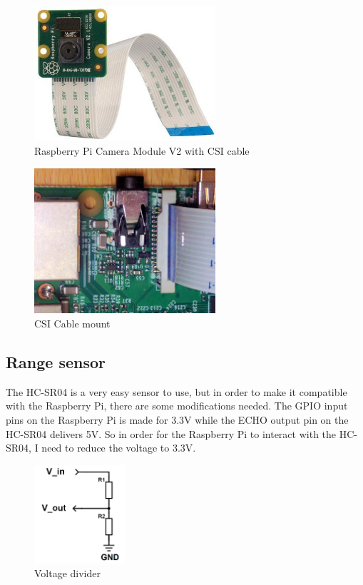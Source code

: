 \begin{figure}[h]
  \centering
  \includegraphics[width=0.6\textwidth]{fig/picam2}
  \caption{Raspberry Pi Camera Module V2 with CSI cable}
  \label{fig:picam2}
\end{figure}

\begin{figure}[h]
  \centering
  \includegraphics[width=0.6\textwidth]{fig/csi}
  \caption{CSI Cable mount}
  \label{fig:csi}
\end{figure}

\newpage
\subsection{Range sensor}
The HC-SR04 is a very easy sensor to use, but in order to make it compatible with the Raspberry Pi, there are some modifications needed. The GPIO input pins on the Raspberry Pi is made for 3.3V while the ECHO output pin on the HC-SR04 delivers 5V. So in order for the Raspberry Pi to interact with the HC-SR04, I need to reduce the voltage to 3.3V.\\

\begin{figure}[h]
  \centering
  \includegraphics[width=0.3\textwidth]{fig/volt}
  \caption{Voltage divider}
  \label{fig:volt}
\end{figure}

